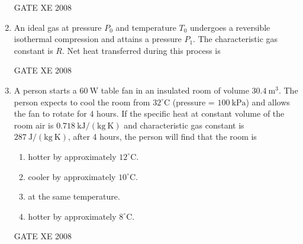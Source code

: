 \documentclass[12pt]{article}
\begin{document}
\begin{enumerate}
\begin{enumerate}
\end{enumerate}

GATE XE 2008

\item An ideal gas at pressure $P_0$ and temperature $T_0$ undergoes a reversible isothermal compression and attains a pressure $P_1$. The characteristic gas constant is $R$. Net heat transferred during this process is  

\begin{enumerate}
\end{enumerate}

GATE XE 2008

\item A person starts a $60\ \mathrm{W}$ table fan in an insulated room of volume $30.4\ \mathrm{m^3}$. The person expects to cool the room from $32^\circ\mathrm{C}$ (pressure = $100\ \mathrm{kPa}$) and allows the fan to rotate for $4$ hours. If the specific heat at constant volume of the room air is $0.718\ \mathrm{kJ/(kg\ K)}$ and characteristic gas constant is $287\ \mathrm{J/(kg\ K)}$, after 4 hours, the person will find that the room is  

\begin{enumerate}
\item  hotter by approximately $12^\circ$C.
\item  cooler by approximately $10^\circ$C.
\item  at the same temperature.
\item  hotter by approximately $8^\circ$C.
\end{enumerate}

GATE XE 2008


\end{enumerate}
\end{document}
